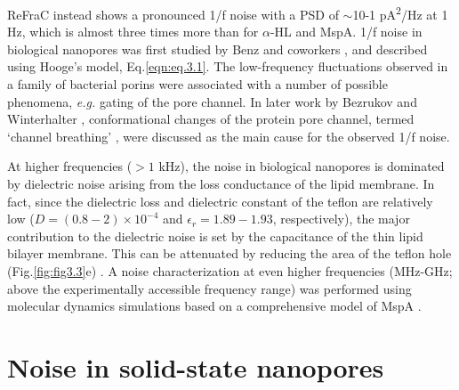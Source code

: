 \noindent ReFraC instead shows a pronounced 1/f noise with a PSD of $\sim$10{-1} pA\textsuperscript{2}/Hz at 1 Hz, which is almost three times more than for $\alpha$-HL and MspA. 1/f noise in biological nanopores was first studied by Benz and coworkers \cite{Wohnsland1997,Nekolla1994}, and described using Hooge’s model, Eq.\ref{eqn:eq.3.1}. The low-frequency fluctuations observed in a family of bacterial porins were associated with a number of possible phenomena, \emph{e.g.} gating of the pore channel\cite{Wohnsland1997}. In later work by Bezrukov and Winterhalter \cite{Bezrukov2000}, conformational changes of the protein pore channel, termed ‘channel breathing’ \cite{Lauger1985}, were discussed as the main cause for the observed 1/f noise.


At higher frequencies ($>1$ kHz), the noise in biological nanopores is dominated by dielectric noise arising from the loss conductance of the lipid membrane. In fact, since the dielectric loss and dielectric constant of the teflon are relatively low ($D=(0.8-2)\times 10^{-4}$ and $\epsilon_r=1.89-1.93$, respectively), the major contribution to the dielectric noise is set by the capacitance of the thin lipid bilayer membrane. This can be attenuated by reducing the area of the teflon hole (Fig.\ref{fig:fig3.3}e) \cite{Mayer2003,Akeson2009}. A noise characterization at even higher frequencies (MHz-GHz; above the experimentally accessible frequency range) was performed using molecular dynamics simulations based on a comprehensive model of MspA \cite{Bhattacharya2016}.

\section{Noise in solid-state nanopores}

